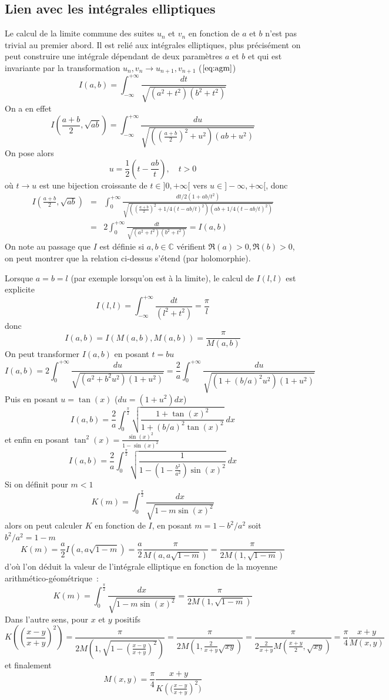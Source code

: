 \documentclass[a4paper,11pt]{book}
\begin{document}
\begin{giacjshere}
\section{Lien avec les int\'egrales elliptiques}
Le calcul de la limite commune des suites $u_n$ et $v_n$ en fonction
de $a$ et $b$ n'est pas trivial
au premier abord. Il est reli\'e aux int\'egrales elliptiques, plus
pr\'ecis\'ement on peut construire une int\'egrale d\'ependant
de deux param\`etres $a$ et $b$ et qui est invariante par
la transformation $u_n,v_n \rightarrow u_{n+1},v_{n+1}$ (\(\ref{eq:agm}\))
\[ I(a,b)=\int_{-\infty}^{+\infty}  \frac{dt} {\sqrt{(a^2+t^2)(b^2+t^2)}}
\]
On a en effet
\[ I(\frac{a+b}{2},\sqrt{ab})
= \int_{-\infty}^{+\infty}  \frac{du}{\sqrt{((\frac{a+b}{2})^2+u^2)(ab+u^2)}} \]
On pose alors 
\[ u=\frac{1}{2} (t-\frac{ab}{t}), \quad t>0 \]
o\`u $t \rightarrow u$ est une bijection croissante de $t\in]0,+\infty[$ vers 
$u \in ]-\infty,+\infty[$, donc
\begin{eqnarray*}
I(\frac{a+b}{2},\sqrt{ab})
&=& \int_{0}^{+\infty}  \frac{dt/2(1+ab/t^2)}{\sqrt{((\frac{a+b}{2})^2+1/4(t-ab/t)^2)(ab+1/4(t-ab/t)^2)}}\\
&=& 2 \int_{0}^{+\infty} \frac{dt}{\sqrt{(a^2+t^2)(b^2+t^2)}}
= I(a,b)
\end{eqnarray*}
On note au passage que $I$ est définie si $a,b \in \mathbb{C}$ vérifient $\Re(a)>0, \Re(b)>0$,
on peut montrer que la relation ci-dessus s'étend (par holomorphie).

Lorsque $a=b=l$ (par exemple lorsqu'on est \`a la limite), 
le calcul de $I(l,l)$ est explicite
\[ I(l,l)=\int_{-\infty}^{+\infty}  \frac{dt}{(l^2+t^2)} = \frac{\pi}{l}\]
donc
\[ I(a,b)=I(M(a,b),M(a,b))=\frac{\pi}{M(a,b)}\]
On peut transformer $I(a,b)$ en posant $t=bu$
\[ I(a,b)=2\int_{0}^{+\infty}  \frac{du}{\sqrt{(a^2+b^2u^2)(1+u^2)}}
= \frac{2}{a} \int_{0}^{+\infty}  \frac{du}{\sqrt{(1+(b/a)^2u^2)(1+u^2)}} \]
Puis en posant $u=\tan(x)$ ($du=(1+u^2) dx$)
\[ I(a,b)=\frac{2}{a} \int_0^{\frac{\pi}{2}} 
\sqrt{\frac{1+\tan(x)^2}{1+(b/a)^2\tan(x)^2}} \ dx \]
et enfin en posant $\tan^2(x)=\frac{\sin(x)^2}{1-\sin(x)^2}$
\[ I(a,b)= \frac{2}{a} \int_0^{\frac{\pi}{2}}  
\sqrt{ \frac{1}{1-(1-\frac{b^2}{a^2})\sin(x)^2} } \ dx\]
Si on d\'efinit pour $m<1$
\[ K(m)=\int_0^{\frac{\pi}{2}} \frac{dx}{\sqrt{1-m \sin(x)^2}} \]
alors on peut calculer $K$ en fonction de $I$, en posant
$m=1-b^2/a^2$ soit $b^2/a^2=1-m$
\[ K(m)=\frac{a}{2} I(a,a\sqrt{1-m})=\frac{a}{2}\frac{\pi}{M(a,a\sqrt{1-m})}
=\frac{\pi}{2M(1,\sqrt{1-m})} 
\]
d'o\`u l'on d\'eduit la valeur de l'int\'egrale elliptique en fonction
de la moyenne arithm\'etico-g\'eom\'etrique~:
\begin{equation} \label{eq:K}
K(m)=\int_0^{\frac{\pi}{2}} \frac{dx}{\sqrt{1-m \sin(x)^2}}= 
\frac{\pi}{2M(1,\sqrt{1-m})} 
\end{equation}
Dans l'autre sens, pour $x$ et $y$ positifs
\[ K( (\frac{x-y}{x+y})^2 )=  \frac{\pi}{2M(1,\sqrt{1-(\frac{x-y}{x+y})^2})}
=  \frac{\pi}{2M(1,\frac{2}{x+y}\sqrt{xy})}
= \frac{\pi}{2 \frac{2}{x+y} M(\frac{x+y}{2},\sqrt{xy}) }
= \frac{\pi}{4} \frac{x+y}{M(x,y)}
\]
et finalement
\[ M(x,y)=\frac{\pi}{4} \frac{x+y}{ K\left( (\frac{x-y}{x+y}\right)^2 )}\]


\end{giacjshere}
\end{document}
